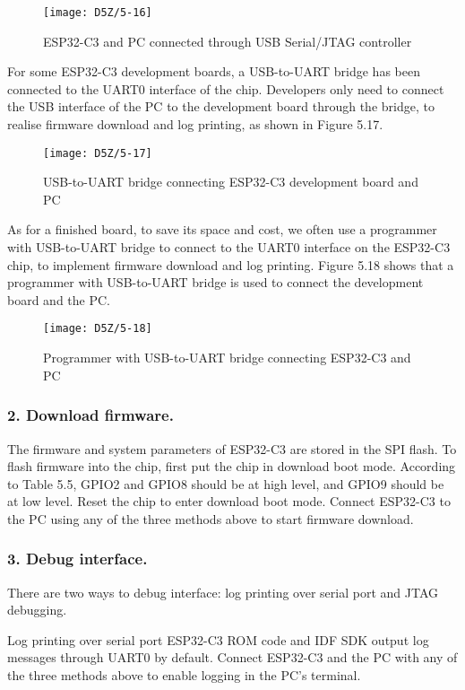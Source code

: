 \documentclass[a4paper,12pt]{book}
\begin{document}
\begin{figure}[h!]
    \centering
    \texttt{[image: D5Z/5-16]}
    \caption{ESP32-C3 and PC connected through USB Serial/JTAG controller}
\end{figure}

For some ESP32-C3 development boards, a USB-to-UART bridge has been connected to the UART0 interface of the chip. Developers only need to connect the USB interface of the PC to the development board through the bridge, to realise firmware download and log printing, as shown in Figure 5.17.

\begin{figure}[h!]
    \centering
    \texttt{[image: D5Z/5-17]}
    \caption{USB-to-UART bridge connecting ESP32-C3 development board and PC}
\end{figure}

As for a finished board, to save its space and cost, we often use a programmer with USB-to-UART bridge to connect to the UART0 interface on the ESP32-C3 chip, to implement firmware download and log printing. Figure 5.18 shows that a programmer with USB-to-UART bridge is used to connect the development board and the PC.

\begin{figure}[h!]
    \centering
    \texttt{[image: D5Z/5-18]}
    \caption{Programmer with USB-to-UART bridge connecting ESP32-C3 and PC}
\end{figure}

\subsubsection{2. Download firmware.}
The firmware and system parameters of ESP32-C3 are stored in the SPI flash. To flash firmware into the chip, first put the chip in download boot mode. According to Table 5.5, GPIO2 and GPIO8 should be at high level, and GPIO9 should be at low level. Reset the chip to enter download boot mode. Connect ESP32-C3 to the PC using any of the three methods above to start firmware download.

\subsubsection{3. Debug interface.}

There are two ways to debug interface: log printing over serial port and JTAG debugging. 

\begin{term}{Log printing over serial port}
    ESP32-C3 ROM code and IDF SDK output log messages through UART0 by default. Connect ESP32-C3 and the PC with any of the three methods above to enable logging in the PC’s terminal.
\end{term}
\end{document}
